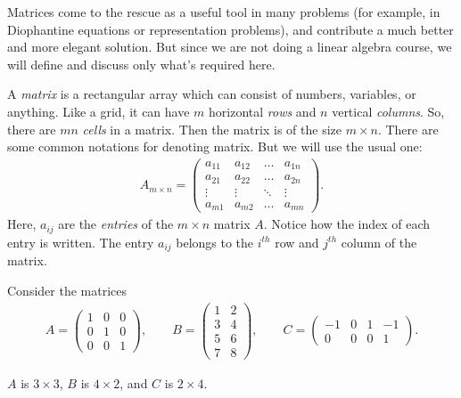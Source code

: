 \documentclass{subfile}
\begin{document}
	Matrices come to the rescue as a useful tool in many problems (for example, in Diophantine equations or representation problems), and contribute a much better and more elegant solution. But since we are not doing a linear algebra course, we will define and discuss only what's required here.
	
	\begin{definition}[Matrix]
		A \textit{matrix} is a rectangular array which can consist of numbers, variables, or anything. Like a grid, it can have $m$ horizontal \textit{rows} and $n$ vertical \textit{columns}. So, there are $mn$ \textit{cells} in a matrix. Then the matrix is of the size $m\times n$. There are some common notations for denoting matrix. But we will use the usual one:
		\begin{align*}
		{A_{m \times n}} = \begin{pmatrix}
			{{a_{11}}}&{{a_{12}}}& \ldots &{{a_{1n}}}\\
			{{a_{21}}}&{{a_{22}}}& \ldots &{{a_{2n}}}\\
			\vdots & \vdots & \ddots & \vdots \\
			{{a_{m1}}}&{{a_{m2}}}& \ldots &{{a_{mn}}}
			\end{pmatrix}.
			\end{align*}
		Here, $a_{ij}$ are the \textit{entries} of the $m\times n$ matrix $A$. Notice how the index of each entry is written. The entry $a_{ij}$ belongs to the $i^{th}$ row and $j^{th}$ column of the matrix.
	\end{definition}
	
	\begin{example}
	Consider the matrices
		\begin{align*}
		A = \begin{pmatrix}
			1&0&0\\
			0&1&0\\
			0&0&1
			\end{pmatrix},\qquad B = \begin{pmatrix}
			1&2\\
			3&4\\
			5&6\\
			7&8
			\end{pmatrix},\qquad C = \begin{pmatrix}
			{ - 1}&0&1&{ - 1}\\
			0&0&0&1
			\end{pmatrix}.
		\end{align*}
		
	$A$ is $3\times 3$, $B$ is $4\times 2$, and $C$ is $2 \times 4$. 
	\end{example}
	
\end{document}
